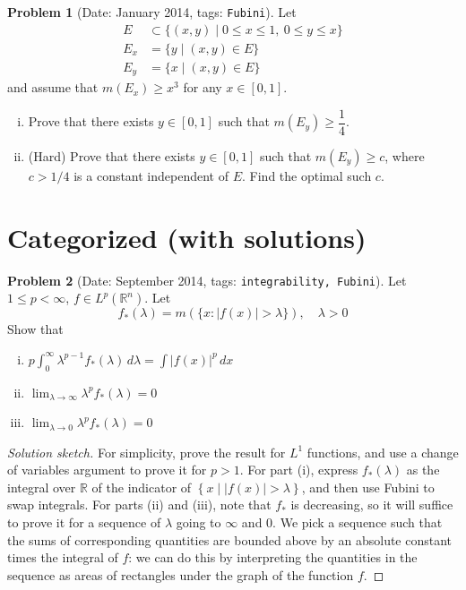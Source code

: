 \documentclass[11pt, notitlepage]{article}
\theoremstyle{definition}
\theoremstyle{definition}
\theoremstyle{definition}
\newtheorem{probstate}{Problem}
\theoremstyle{remark}
\newenvironment{problem}[2]{
    \begin{probstate}[Date: #1, tags: {\color{white} \texttt{#2}}]
}
{
  \end{probstate}
}
\newenvironment{sketch}{
    \begin{proof}[Solution sketch]
}
{
    \end{proof}
}
\begin{document}
\begin{problem}{January 2014}{Fubini}
Let
\begin{align*}
E &\subset \{(x,y) \mid 0 \le x \le 1, \ 0 \le y \le x\}\\
E_x &= \{y\mid (x,y)\in E\}\\
E_y &= \{x\mid (x,y)\in E\}
\end{align*}
and assume that $m(E_x) \ge x^3$ for any $x \in [0,1]$.
\begin{enumerate}[(i)]
 \item Prove that there exists $y \in [0,1]$ such that $m(E_y) \ge \dfrac{1}{4}$.
 \item (Hard) Prove that there exists $y \in [0,1]$ such that $m(E_y) \ge c$, where $c>1/4$ is a constant independent of $E$. Find the optimal such $c$.
\end{enumerate}
\end{problem}

\section{Categorized (with solutions)}

\begin{problem}{September 2014}{integrability, Fubini}
Let $1\le p<\infty$, $f\in L^p(\mathbb R^n)$. Let
$$f_*(\lambda)=m(\{x: |f(x)|>\lambda\}), \quad \lambda>0$$
Show that
\begin{enumerate}[(i)]
\item$p\int_0^\infty \lambda^{p-1} f_*(\lambda)\,d\lambda= \int |f(x)|^p\,dx$
\item  $\lim_{\lambda\to\infty}\lambda^p f_*(\lambda)=0$
\item $\lim_{\lambda\to 0}\lambda^p f_*(\lambda)=0$
\end{enumerate}
\end{problem}
\begin{sketch}
For simplicity, prove the result for $L^1$ functions, and use a change of variables argument to prove it for $p > 1$.
For part (i), express $f_{\ast}(\lambda)$ as the integral over $\mathbb{R}$ of the indicator of $\left\{x \mid |f(x)| > \lambda \right\}$, and then use Fubini to swap integrals.
For parts (ii) and (iii), note that $f_{\ast}$ is decreasing, so it will suffice to prove it for a sequence of $\lambda$ going to $\infty$ and $0$.
We pick a sequence such that the sums of corresponding quantities are bounded above by an absolute constant times the integral of $f$: we can do this by interpreting the quantities in the sequence as areas of rectangles under the graph of the function $f$.
\end{sketch}
\end{document}
